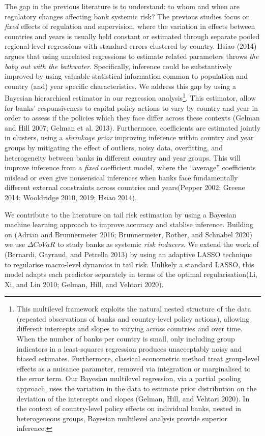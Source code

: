 \documentclass[
  10pt,
]{article}
\begin{document}
The gap in the previous literature is to understand: to whom and when
are regulatory changes affecting bank systemic risk? The previous
studies focus on \emph{fixed} effects of regulation and supervision,
where the variation in effects between countries and years is usually
held constant or estimated through separate pooled regional-level
regressions with standard errors clustered by country. Hsiao (2014)
argues that using unrelated regressions to estimate related parameters
throws \emph{the baby out with the bathwater}. Specifically, inference
could be substantively improved by using valuable statistical
information common to population and country (and) year specific
characteristics. We address this gap by using a Bayesian hierarchical
estimator in our regression analysis\footnote{This multilevel framework
  exploits the natural nested structure of the data (repeated
  observations of banks and country-level policy actions), allowing
  different intercepts and slopes to varying across countries and over
  time. When the number of banks per country is small, only including
  group indicators in a least-squares regression produces unacceptably
  noisy and biased estimates. Furthermore, classical econometric method
  treat group-level effects as a nuisance parameter, removed via
  integration or marginalised to the error term. Our Bayesian multilevel
  regression, via a partial pooling approach, uses the variation in the
  data to estimate prior distribution on the deviation of the intercepts
  and slopes (Gelman, Hill, and Vehtari 2020). In the context of
  country-level policy effects on individual banks, nested in
  heterogeneous groups, Bayesian multilevel analysis provide superior
  inference.}. This estimator, allow for banks' responsiveness to
capital policy actions to vary by country and year in order to assess if
the policies which they face differ across these contexts (Gelman and
Hill 2007; Gelman et al. 2013). Furthermore, coefficients are estimated
jointly in clusters, using a \emph{shrinkage prior} improving inference
within country and year groups by mitigating the effect of outliers,
noisy data, overfitting, and heterogeneity between banks in different
country and year groups. This will improve inference from a \emph{fixed}
coefficient model, where the ``average'' coefficients mislead or even
give nonsensical inferences when banks face fundamentally different
external constraints across countries and years(Pepper 2002; Greene
2014; Wooldridge 2010, 2019; Hsiao 2014).

We contribute to the literature on tail risk estimation by using a
Bayesian machine learning approach to improve accuracy and stablise
inference. Building on (Adrian and Brunnermeier 2016; Brunnermeier,
Rother, and Schnabel 2020) we use \(\Delta CoVaR\) to study banks as
systemic \emph{risk inducers}. We extend the work of (Bernardi, Gayraud,
and Petrella 2013) by using an adaptive LASSO technique to regularise
macro-level dynamics in tail risk. Unlikely a standard LASSO, this model
adapts each predictor separately in terms of the optimal
regularisation(Li, Xi, and Lin 2010; Gelman, Hill, and Vehtari 2020).
\end{document}
